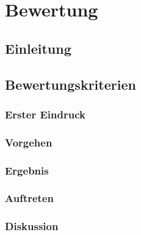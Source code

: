 \chapter{Bewertung}

\section{Einleitung}

\section{Bewertungskriterien}

\subsection{Erster Eindruck}

\subsection{Vorgehen}

\subsection{Ergebnis}

\subsection{Auftreten}

\subsection{Diskussion}